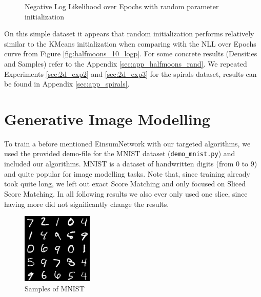 \begin{figure}[H]
    \centering
    \caption{Negative Log Likelihood over Epochs with random parameter initialization}
    \label{fig:halfmoons_10_random_logp}
\end{figure}

On this simple dataset it appears that random initialization performs relatively similar to the KMeans initialization when comparing with the NLL over Epochs curve from Figure \ref{fig:halfmoons_10_logp}. For some concrete results (Densities and Samples) refer to the Appendix \ref{sec:app_halfmoons_rand}.
We repeated Experiments \ref{sec:2d_exp2} and \ref{sec:2d_exp3} for the spirals dataset, results can be found in Appendix \ref{sec:app_spirals}.

\section{Generative Image Modelling}
\label{sec:exp_image}

To train a before mentioned EinsumNetwork \cite{einsum} with our targeted algorithms, we used the provided demo-file for the MNIST \cite{mnist} dataset (\texttt{demo\_mnist.py}) and included 
our algorithms. MNIST is a dataset of handwritten digits (from 0 to 9) and quite popular for image modelling tasks.
Note that, since training already took quite long, we left out exact Score Matching and only focused on Sliced Score Matching. 
In all following results we also ever only used one slice, since having more did not significantly 
change the results. \\

\begin{figure}[H]
    \centering
    \includegraphics[width=0.3\textwidth]{figures/einsum/mnist/[]_ground_truth.png}
    \caption{Samples of MNIST}
\end{figure}

